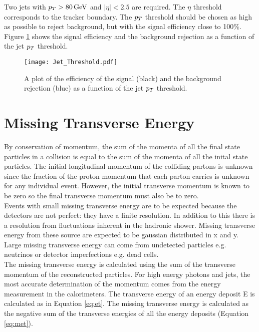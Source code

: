 Two jets with $p_{T} > 80 \, \mathrm{GeV}$ and $|\eta| < 2.5$ are required. The $\eta$
threshold corresponds to the tracker boundary. The $p_{T}$ threshold should be
chosen as high as possible to reject background, but with the signal efficiency
close to 100\%. Figure \ref{fig:Jet_Threshold} shows the signal efficiency and 
the background rejection as a function of the jet $p_{T}$ threshold. 

\begin{figure}
\begin{center}
\texttt{[image: Jet\_Threshold.pdf]}
\end{center}
\caption{A plot of the efficiency of the signal (black) and the background
rejection (blue) as a function of the jet $p_{T}$ threshold.}
\label{fig:Jet_Threshold}
\end{figure}

\section{Missing Transverse Energy}
\label{sec:Missing_Transverse_Energy}

By conservation of momentum, the sum of the momenta of all the final state
particles in a collision is equal to the sum of the momenta of all the inital
state particles. The initial longitudinal momentum of the colliding partons is
unknown since the fraction of the proton momentum that each parton carries is
unknown for any individual event. However, the initial transverse momentum is
known to be zero so the final transverse momentum must also be to zero. \\

Events with small missing transverse energy are to be expected because the 
detectors are not perfect: they have a finite resolution. In addition to this
there is a resolution from fluctuations inherent in the hadronic shower. Missing
transverse energy from these source are expected to be gaussian distributed in x
and y. Large missing transverse energy can come from undetected particles e.g. 
neutrinos or detector imperfections e.g. dead cells. \\

The missing transverse energy is calculated using the sum of the transverse
momentum of the reconstructed particles. For high energy photons and jets, the 
most accurate determination of the momentum comes from the energy measurement in
the calorimeters. The transverse energy of an energy deposit E is calculated as 
in Equation \ref{eq:et}. The missing transverse energy is calculated as the
negative sum of the transverse energies of all the energy deposits (Equation
\ref{eq:met}). \\

